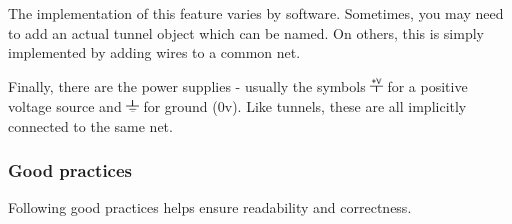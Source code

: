 \documentclass[letterpaper]{article}
\begin{document}
{\sffamily\color[rgb]{0.30980393,0.5058824,0.7411765}
The implementation of this feature varies by software. Sometimes, you may need to add an actual tunnel object which can
be named. On others, this is simply implemented by adding wires to a common net.}

{\sffamily\color[rgb]{0.30980393,0.5058824,0.7411765}
Finally, there are the power supplies - usually the symbols 
\includegraphics[width=0.1291in,height=0.1618in]{figures/ee4document-img011.png}  for a positive voltage source and 
\includegraphics[width=0.1291in,height=0.1291in]{figures/ee4document-img012.png}  for ground (0v). Like tunnels, these are all
implicitly connected to the same net.}


\bigskip

\subsubsection{Good practices}
\hypertarget{Toc337742680}{}{\sffamily\color[rgb]{0.30980393,0.5058824,0.7411765}
Following good practices helps ensure readability and correctness.}
\end{document}
